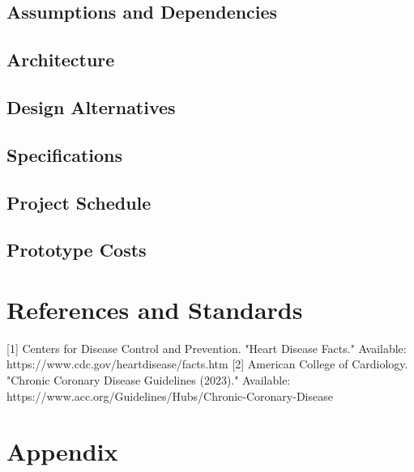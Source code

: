 \documentclass{article}
\begin{document}
\subsection{Assumptions and Dependencies}
\subsection{Architecture}
\subsection{Design Alternatives}
\subsection{Specifications}
\subsection{Project Schedule}
\subsection{Prototype Costs}

\section{References and Standards}
[1] Centers for Disease Control and Prevention. "Heart Disease Facts." Available: https://www.cdc.gov/heartdisease/facts.htm
[2] American College of Cardiology. "Chronic Coronary Disease Guidelines (2023)." Available: https://www.acc.org/Guidelines/Hubs/Chronic-Coronary-Disease
\section{Appendix}
\end{document}
